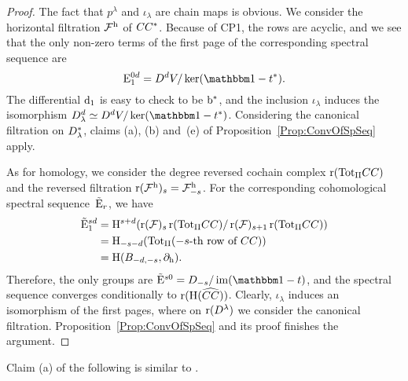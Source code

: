 \documentclass[\MainFolder/Text.tex]{subfiles}
\begin{document}
\begin{proof}
The fact that $p^\lambda$ and $\iota_\lambda$ are chain maps is obvious. We consider the horizontal filtration $\mathcal{F}^{\mathrm{h}}$ of $CC^*$. Because of CP1, the rows are acyclic, and we see that the only non-zero terms of the first page of the corresponding spectral sequence are 
\[ \SSPage_1^{0 d} =  \HC^d V / \ker(\Id - \CycPermOp^*). \] The differential $\mathrm{d}_1$ is easy to check to be $\mathrm{b}^*$, and the inclusion $\iota_\lambda$ induces the isomorphism $\HC_{\lambda}^d\simeq \HC^d V / \ker(\Id - \CycPermOp^*)$. Considering the canonical filtration on $D^*_\lambda$, claims (a), (b) and~(e) of Proposition~\ref{Prop:ConvOfSpSeq} apply.

As for homology, we consider the degree reversed cochain complex $\operatorname{r}({\mathrm{Tot}_{\mathrm{II}}} CC)$ and the reversed filtration $\operatorname{r}(\mathcal{F}^{\mathrm{h}})_s = \mathcal{F}^{\mathrm{h}}_{-s}$. For the corresponding cohomological spectral sequence~$\tilde{\mathrm{E}}_r$, we have
\begin{align*}
\tilde{\mathrm{E}}_1^{sd} &= \mathrm{H}^{s+d}(\operatorname{r}(\mathcal{F})_{s}\operatorname{r}({\mathrm{Tot}_{\mathrm{II}}} CC)/\operatorname{r}(\mathcal{F})_{s+1}\operatorname{r}({\mathrm{Tot}_{\mathrm{II}}}CC)) \\
&=\mathrm{H}_{-s-d}({\mathrm{Tot}_{\mathrm{II}}}(-s\text{-th row of }CC)) \\
&=\mathrm{H}(B_{-d,-s},\partial_{\mathrm{h}}).
\end{align*}
Therefore, the only groups are $\tilde{\SSPage}^{s0} = \HC_{-s}/\im(\Id-\CycPermOp)$, and the spectral sequence converges conditionally to $\operatorname{r}(\mathrm{H}(\widehat{CC}))$. Clearly, $\iota_\lambda$ induces an isomorphism of the first pages, where on $\operatorname{r}(D^\lambda)$ we consider the canonical filtration. Proposition~\ref{Prop:ConvOfSpSeq} and its proof finishes the argument.
\end{proof}

Claim (a) of the following is similar to \cite[Lemma 2.12]{Cieliebak2018b}.
\end{document}
